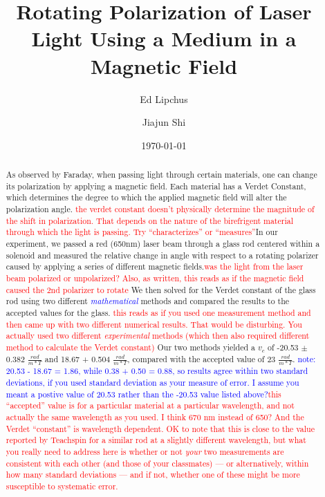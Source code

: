 \documentclass[prb,preprint]{revtex4-1}
\begin{document}
\title{Rotating Polarization of Laser Light Using a Medium in a Magnetic Field}

\author{Ed Lipchus}

\author{Jiajun Shi}

\date{\today}

\begin{abstract}

As observed by Faraday, when passing light through certain materials, one can change its polarization by applying a magnetic field. Each material has a Verdet Constant, which determines  the degree to which the applied magnetic field will alter the polarization angle. \textcolor{red}{the verdet constant doesn't physically determine the magnitude of the shift in polarization. That depends on the nature of the birefrigent material through which the light is passing. Try ``characterizes'' or ``measures''}In our experiment, we passed a red (650nm) laser beam through a glass rod centered within a solenoid and measured the relative change in angle with respect to a rotating polarizer caused by applying a series of different magnetic fields.\textcolor{red}{was the light from the laser beam polarized or unpolarized? Also, as written, this reads as if the magnetic field caused the 2nd polarizer to rotate} We then solved for the Verdet constant of the glass rod using two different \textcolor{blue}{\textit{mathematical}} methods and compared the results to the accepted values for the glass. \textcolor{red}{this reads as if you used one measurement method and then came up with two different numerical results. That would be disturbing. You actually used two different \textit{experimental} methods (which then also required different method to calculate the Verdet constant)} Our two methods yielded a $v_c$ of -20.53 $\pm$ 0.382 $\frac{rad}{m*T}$ and 18.67 + 0.504 $\frac{rad}{m*T}$, compared with the accepted value of 23 $\frac{rad}{m*T}$. \textcolor{blue}{note: 20.53 - 18.67 = 1.86, while 0.38 + 0.50 = 0.88, so results agree within two standard deviations, if you used standard deviation as your measure of error. I assume you meant a postive value of 20.53 rather than the -20.53 value listed above?}\textcolor{red}{this ``accepted'' value is for a particular material at a particular wavelength, and not actually the same wavelength as you used. I think 670 nm instead of 650? And the Verdet ``constant'' is wavelength dependent. OK to note that this is close to the value reported by Teachspin for a similar rod at a slightly different wavelength, but what you really need to address here is whether or not \textit{your} two measurements are consistent with each other (and those of your classmates) --- or alternatively, within how many standard deviations ---  and if not, whether one of these might be more susceptible to systematic error. }

\end{abstract}
\end{document}

